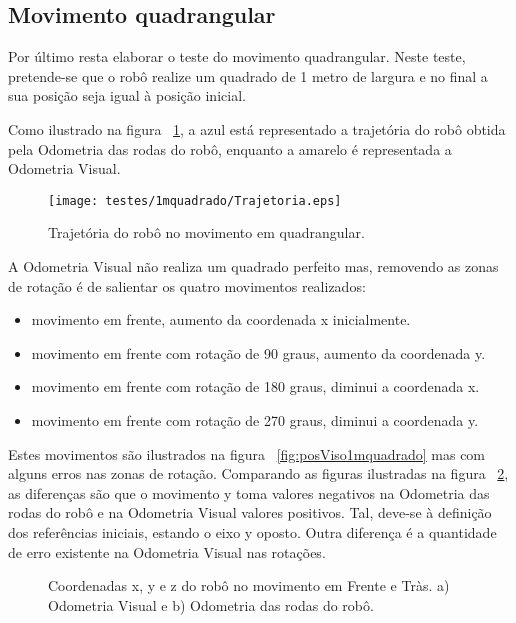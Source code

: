 \FloatBarrier
\subsection{Movimento quadrangular}\label{subsubsection:Quadrado}


Por último resta elaborar o teste do movimento quadrangular. Neste teste, pretende-se que o robô realize um quadrado de 1 metro de largura e no final a sua posição seja igual à posição inicial.

Como ilustrado na figura ~\ref{fig:trajRobo1mquadrado}, a azul está representado a trajetória do robô obtida pela Odometria das rodas do robô, enquanto a amarelo é representada a Odometria Visual. 


\begin{figure}[h!]
	\begin{center}
		\leavevmode		
		\texttt{[image: testes/1mquadrado/Trajetoria.eps]}
		\caption{Trajetória do robô no movimento em quadrangular.}
		\label{fig:trajRobo1mquadrado}
	\end{center}
\end{figure}


A Odometria Visual não realiza um quadrado perfeito mas, removendo as zonas de rotação é de salientar os quatro movimentos realizados:
\begin{itemize}
 	\item movimento em frente, aumento da coordenada x inicialmente.
 	\item movimento em frente com rotação de 90 graus, aumento da coordenada y.
 	\item movimento em frente com rotação de 180 graus, diminui a coordenada x.
 	\item movimento em frente com rotação de 270 graus, diminui a coordenada y.
\end{itemize}

Estes movimentos são ilustrados na figura ~\ref{fig:posViso1mquadrado} mas com alguns erros nas zonas de rotação. Comparando as figuras ilustradas na figura ~\ref{fig:pos1mquadrado}, as diferenças são que o movimento y toma valores negativos na Odometria das rodas do robô e na Odometria Visual valores positivos. Tal, deve-se à definição dos referências iniciais, estando o eixo y oposto. Outra diferença é a quantidade de erro existente na Odometria Visual nas rotações.


\begin{figure}[h!]
	\centering
	\qquad
	\caption{Coordenadas x, y e z do robô  no movimento em Frente e Tràs. a) Odometria Visual e b) Odometria das rodas do robô.}
	\label{fig:pos1mquadrado}
\end{figure}


